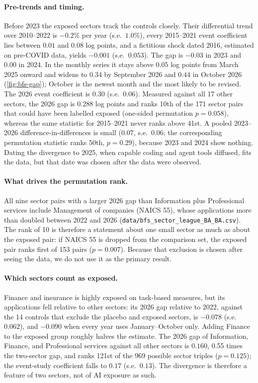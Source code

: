 \paragraph{Pre-trends and timing.}
Before 2023 the exposed sectors track the controls closely.
Their differential trend over 2010--2022 is $-0.2\%$ per year (s.e.\ $1.0\%$), every 2015--2021 event coefficient lies between $0.01$ and $0.08$ log points, and a fictitious shock dated 2016, estimated on pre-COVID data, yields $-0.001$ (s.e.\ $0.053$).
The gap is $-0.03$ in 2023 and $0.00$ in 2024.
In the monthly series it stays above $0.05$ log points from March 2025 onward and widens to $0.34$ by September 2026 and $0.44$ in October 2026 (\cref{fig:bfs-gap}); October is the newest month and the most likely to be revised.
The 2026 event coefficient is $0.30$ (s.e.\ $0.06$).
Measured against all 17 other sectors, the 2026 gap is $0.288$ log points and ranks 10th of the 171 sector pairs that could have been labelled exposed (one-sided permutation $p = 0.058$), whereas the same statistic for 2015--2021 never ranks above 41st.
A pooled 2023--2026 difference-in-differences is small ($0.07$, s.e.\ $0.06$; the corresponding permutation statistic ranks 50th, $p = 0.29$), because 2023 and 2024 show nothing.
Dating the divergence to 2025, when capable coding and agent tools diffused, fits the data, but that date was chosen after the data were observed.

\paragraph{What drives the permutation rank.}
All nine sector pairs with a larger 2026 gap than Information plus Professional services include Management of companies (NAICS 55), whose applications more than doubled between 2022 and 2026 (\texttt{data/bfs\_sector\_league\_BA\_BA.csv}).
The rank of 10 is therefore a statement about one small sector as much as about the exposed pair: if NAICS 55 is dropped from the comparison set, the exposed pair ranks first of 153 pairs ($p = 0.007$).
Because that exclusion is chosen after seeing the data, we do not use it as the primary result.

\paragraph{Which sectors count as exposed.}
Finance and insurance is highly exposed on task-based measures, but its applications fell relative to other sectors: its 2026 gap relative to 2022, against the 14 controls that exclude the placebo and exposed sectors, is $-0.078$ (s.e.\ $0.062$), and $-0.090$ when every year uses January--October only.
Adding Finance to the exposed group roughly halves the estimate.
The 2026 gap of Information, Finance, and Professional services against all other sectors is $0.160$, 0.55 times the two-sector gap, and ranks 121st of the 969 possible sector triples ($p = 0.125$); the event-study coefficient falls to $0.17$ (s.e.\ $0.13$).
The divergence is therefore a feature of two sectors, not of AI exposure as such.

